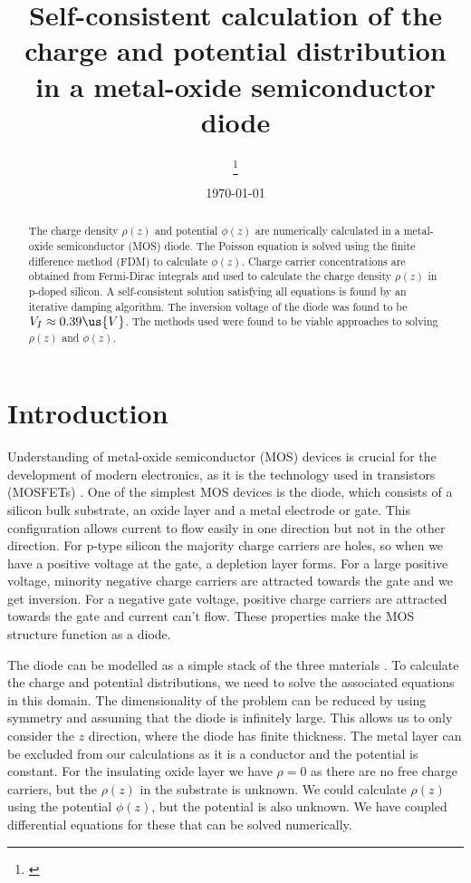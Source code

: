 \documentclass[10pt]{article}
\title {
  Self-consistent calculation of the charge and potential distribution \\ in a metal-oxide
semiconductor diode
}
\date{\today}
\author[1] {
  \firstauth
  \thanks{\href{mailto: \email}{\email}}
}
\begin{document}
\setlength{\belowcaptionskip}{0pt}


\normalsize

\maketitle

\begin{abstract}
  The charge density $\rho(z)$ and potential $\phi(z)$ are numerically calculated in a metal-oxide semiconductor (MOS) diode. The Poisson equation is solved using the finite difference method (FDM) to calculate $\phi(z)$. Charge carrier concentrations are obtained from Fermi-Dirac integrals and used to calculate the charge density $\rho(z)$ in p-doped silicon. A self-consistent solution satisfying all equations is found by an iterative damping algorithm. The inversion voltage of the diode was found to be $V_I \approx 0.39 \us{V}$. The methods used were found to be viable approaches to solving $\rho(z)$ and $\phi(z)$.
\end{abstract}


\section{Introduction}

Understanding of metal-oxide semiconductor (MOS) devices is crucial for the development of modern electronics, as it is the technology used in transistors (MOSFETs) \cite{sze}. One of the simplest MOS devices is the diode, which consists of a silicon bulk substrate, an oxide layer and a metal electrode or gate. This configuration allows current to flow easily in one direction but not in the other direction. For p-type silicon the majority charge carriers are holes, so when we have a positive voltage at the gate, a depletion layer forms. For a large positive voltage, minority negative charge carriers are attracted towards the gate and we get inversion. For a negative gate voltage, positive charge carriers are attracted towards the gate and current can't flow. These properties make the MOS structure function as a diode.

The diode can be modelled as a simple stack of the three materials \cite{ass}. To calculate the charge and potential distributions, we need to solve the associated equations in this domain. The dimensionality of the problem can be reduced by using symmetry and assuming that the diode is infinitely large. This allows us to only consider the $z$ direction, where the diode has finite thickness. The metal layer can be excluded from our calculations as it is a conductor and the potential is constant. For the insulating oxide layer we have $\rho = 0$ as there are no free charge carriers, but the $\rho(z)$ in the substrate is unknown. We could calculate $\rho(z)$ using the potential $\phi(z)$, but the potential is also unknown. We have coupled differential equations for these that can be solved numerically.
\end{document}
